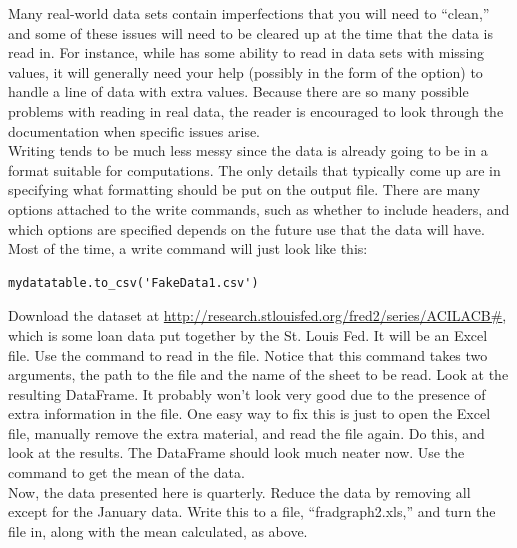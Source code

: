 Many real-world data sets contain imperfections that you will need to ``clean,'' and some of these issues will need to be cleared up at the time that the data is read in. For instance, while  has some ability to read in data sets with missing values, it will generally need your help (possibly in the form of the  option) to handle a line of data with extra values. Because there are so many possible problems with reading in real data, the reader is encouraged to look through the documentation when specific issues arise.\\
\indent Writing tends to be much less messy since the data is already going to be in a format suitable for computations. The only details that typically come up are in specifying what formatting should be put on the output file. There are many options attached to the write commands, such as whether to include headers, and which options are specified depends on the future use that the data will have. Most of the time, a write command will just look like this:
\begin{lstlisting}
mydatatable.to_csv('FakeData1.csv')
\end{lstlisting}

\begin{problem}
Download the dataset at \url{http://research.stlouisfed.org/fred2/series/ACILACB#}, which is some loan data put together by the St. Louis Fed. It will be an Excel file. Use the command  to read in the file. Notice that this command takes two arguments, the path to the file and the name of the sheet to be read. Look at the resulting DataFrame. It probably won't look very good due to the presence of extra information in the file. One easy way to fix this is just to open the Excel file, manually remove the extra material, and read the file again. Do this, and look at the results. The DataFrame should look much neater now. Use the  command to get the mean of the data.\\

Now, the data presented here is quarterly. Reduce the data by removing all except for the January data. Write this to a file, ``fradgraph2.xls,'' and turn the file in, along with the mean calculated, as above.
\end{problem}













































